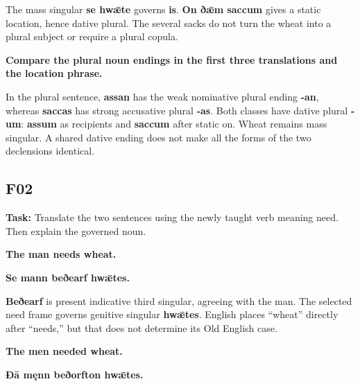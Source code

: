 The mass singular \textbf{se hwǣte} governs \textbf{is}. \textbf{On ðǣm saccum} gives a static location, hence dative plural. The several sacks do not turn the wheat into a plural subject or require a plural copula.

\textbf{Compare the plural noun endings in the first three translations and the location phrase.}

In the plural sentence, \textbf{assan} has the weak nominative plural ending \textbf{-an}, whereas \textbf{saccas} has strong accusative plural \textbf{-as}. Both classes have dative plural \textbf{-um}: \textbf{assum} as recipients and \textbf{saccum} after static on. Wheat remains mass singular. A shared dative ending does not make all the forms of the two declensions identical.

\subsection*{F02}

\textbf{Task:} Translate the two sentences using the newly taught verb meaning need. Then explain the governed noun.

\par\begin{minipage}{\linewidth}\raggedright
\textbf{The man needs wheat.}

\textbf{Se mann beðearf hwǣtes.}
\end{minipage}\par

\textbf{Beðearf} is present indicative third singular, agreeing with the man. The selected need frame governs genitive singular \textbf{hwǣtes}. English places “wheat” directly after “needs,” but that does not determine its Old English case.

\par\begin{minipage}{\linewidth}\raggedright
\textbf{The men needed wheat.}

\textbf{Ðā męnn beðorfton hwǣtes.}
\end{minipage}\par


